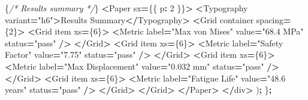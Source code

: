 \documentclass[
]{article}
\newenvironment{Shaded}{\begin{snugshade}}{\end{snugshade}}
\newcommand{\CommentTok}[1]{\textcolor[rgb]{0.56,0.35,0.01}{\textit{#1}}}
\newcommand{\DecValTok}[1]{\textcolor[rgb]{0.00,0.00,0.81}{#1}}
\newcommand{\NormalTok}[1]{#1}
\newcommand{\OperatorTok}[1]{\textcolor[rgb]{0.81,0.36,0.00}{\textbf{#1}}}
\newcommand{\StringTok}[1]{\textcolor[rgb]{0.31,0.60,0.02}{#1}}
\begin{document}
\begin{Shaded}
\begin{Highlighting}[]
\NormalTok{      \{}\CommentTok{/* Results summary */}\NormalTok{\}}
      \OperatorTok{\textless{}}\NormalTok{Paper sx}\OperatorTok{=}\NormalTok{\{\{ p}\OperatorTok{:} \DecValTok{2}\NormalTok{ \}\}}\OperatorTok{\textgreater{}}
        \OperatorTok{\textless{}}\NormalTok{Typography variant}\OperatorTok{=}\StringTok{"h6"}\OperatorTok{\textgreater{}}\NormalTok{Results Summary}\OperatorTok{\textless{}/}\NormalTok{Typography}\OperatorTok{\textgreater{}}
        \OperatorTok{\textless{}}\NormalTok{Grid container spacing}\OperatorTok{=}\NormalTok{\{}\DecValTok{2}\NormalTok{\}}\OperatorTok{\textgreater{}}
          \OperatorTok{\textless{}}\NormalTok{Grid item xs}\OperatorTok{=}\NormalTok{\{}\DecValTok{6}\NormalTok{\}}\OperatorTok{\textgreater{}}
            \OperatorTok{\textless{}}\NormalTok{Metric label}\OperatorTok{=}\StringTok{"Max von Mises"}\NormalTok{ value}\OperatorTok{=}\StringTok{"68.4 MPa"}\NormalTok{ status}\OperatorTok{=}\StringTok{"pass"} \OperatorTok{/\textgreater{}}
          \OperatorTok{\textless{}/}\NormalTok{Grid}\OperatorTok{\textgreater{}}
          \OperatorTok{\textless{}}\NormalTok{Grid item xs}\OperatorTok{=}\NormalTok{\{}\DecValTok{6}\NormalTok{\}}\OperatorTok{\textgreater{}}
            \OperatorTok{\textless{}}\NormalTok{Metric label}\OperatorTok{=}\StringTok{"Safety Factor"}\NormalTok{ value}\OperatorTok{=}\StringTok{"7.75"}\NormalTok{ status}\OperatorTok{=}\StringTok{"pass"} \OperatorTok{/\textgreater{}}
          \OperatorTok{\textless{}/}\NormalTok{Grid}\OperatorTok{\textgreater{}}
          \OperatorTok{\textless{}}\NormalTok{Grid item xs}\OperatorTok{=}\NormalTok{\{}\DecValTok{6}\NormalTok{\}}\OperatorTok{\textgreater{}}
            \OperatorTok{\textless{}}\NormalTok{Metric label}\OperatorTok{=}\StringTok{"Max Displacement"}\NormalTok{ value}\OperatorTok{=}\StringTok{"0.032 mm"}\NormalTok{ status}\OperatorTok{=}\StringTok{"pass"} \OperatorTok{/\textgreater{}}
          \OperatorTok{\textless{}/}\NormalTok{Grid}\OperatorTok{\textgreater{}}
          \OperatorTok{\textless{}}\NormalTok{Grid item xs}\OperatorTok{=}\NormalTok{\{}\DecValTok{6}\NormalTok{\}}\OperatorTok{\textgreater{}}
            \OperatorTok{\textless{}}\NormalTok{Metric label}\OperatorTok{=}\StringTok{"Fatigue Life"}\NormalTok{ value}\OperatorTok{=}\StringTok{"48.6 years"}\NormalTok{ status}\OperatorTok{=}\StringTok{"pass"} \OperatorTok{/\textgreater{}}
          \OperatorTok{\textless{}/}\NormalTok{Grid}\OperatorTok{\textgreater{}}
        \OperatorTok{\textless{}/}\NormalTok{Grid}\OperatorTok{\textgreater{}}
      \OperatorTok{\textless{}/}\NormalTok{Paper}\OperatorTok{\textgreater{}}
    \OperatorTok{\textless{}/}\NormalTok{div}\OperatorTok{\textgreater{}}
\NormalTok{  )}\OperatorTok{;}
\NormalTok{\}}\OperatorTok{;}


\end{Highlighting}
\end{Shaded}
\end{document}
